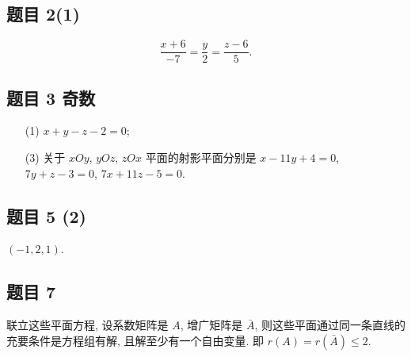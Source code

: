 \subsection*{ 题目 2(1) }
\begin{solution}
\[
\frac{x + 6}{-7} = \frac{y}{2} = \frac{z - 6}{5}.
\]
\end{solution}

\subsection*{ 题目 3 奇数 }
\begin{solution}
\begin{enumerate}
    \item[(1)] $x + y - z - 2 = 0$;
    \item[(3)] 关于 $xOy$, $yOz$, $zOx$ 平面的射影平面分别是 $x - 11y + 4 = 0$, $7y + z - 3 = 0$, $7x + 11z - 5 = 0$.
\end{enumerate}
\end{solution}

\subsection*{ 题目 5 (2) }
\begin{solution}
$(-1, 2, 1)$.
\end{solution}

\subsection*{ 题目 7 }
\begin{solution}
联立这些平面方程, 设系数矩阵是 $A$, 增广矩阵是 $\bar{A}$, 则这些平面通过同一条直线的充要条件是方程组有解, 且解至少有一个自由变量. 即 $r(A) = r(\bar{A}) \leqslant 2$.
\end{solution}